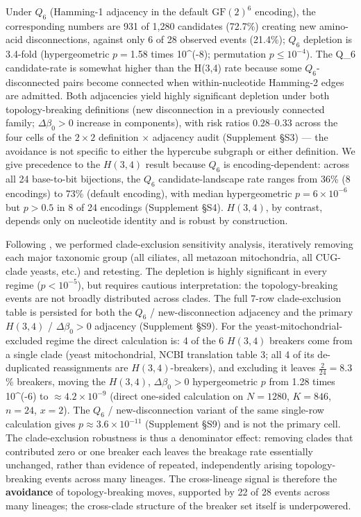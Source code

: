 \documentclass[preprint,11pt,authoryear,a4paper]{elsarticle}
\begin{document}
Under \(Q_{6}\) (Hamming-1 adjacency in the default
\({\text{GF}(2)}^{6}\) encoding), the corresponding numbers are 931 of
1,280 candidates (72.7\%) creating new amino-acid disconnections,
against only 6 of 28 observed events (21.4\%); \(Q_{6}\) depletion is
3.4-fold (hypergeometric \(p =\)1.58 times 10\^{}(-8)\(\); permutation
\(p \leq 10^{- 4}\)). The Q\_6 candidate-rate is somewhat higher than
the H(3,4) rate because some \(Q_{6}\)-disconnected pairs become
connected when within-nucleotide Hamming-2 edges are admitted. Both
adjacencies yield highly significant depletion under both
topology-breaking definitions (new disconnection in a previously
connected family; \(\Delta\beta_{0} > 0\) increase in components), with
risk ratios 0.28--0.33 across the four cells of the \(2 \times 2\)
definition \(\times\) adjacency audit (Supplement §S3) --- the avoidance
is not specific to either the hypercube subgraph or either definition.
We give precedence to the \(H(3,4)\) result because \(Q_{6}\) is
encoding-dependent: across all 24 base-to-bit bijections, the \(Q_{6}\)
candidate-landscape rate ranges from 36\% (8 encodings) to 73\% (default
encoding), with median hypergeometric \(p = 6 \times 10^{- 6}\) but
\(p > 0.5\) in 8 of 24 encodings (Supplement §S4). \(H(3,4)\), by
contrast, depends only on nucleotide identity and is robust by
construction.

Following \citep{sengupta2007}, we performed clade-exclusion sensitivity
analysis, iteratively removing each major taxonomic group (all ciliates,
all metazoan mitochondria, all CUG-clade yeasts, etc.) and retesting.
The depletion is highly significant in every regime (\(p < 10^{- 5}\)),
but requires cautious interpretation: the topology-breaking events are
not broadly distributed across clades. The full 7-row clade-exclusion
table is persisted for both the \(Q_{6}\) / new-disconnection adjacency
and the primary \(H(3,4)\) / \(\Delta\beta_{0} > 0\) adjacency
(Supplement §S9). For the yeast-mitochondrial-excluded regime the direct
calculation is: 4 of the 6 \(H(3,4)\) breakers come from a single clade
(yeast mitochondrial, NCBI translation table 3; all 4 of its
de-duplicated reassignments are \(H(3,4)\)-breakers), and excluding it
leaves \(\frac{2}{24} = 8.3\)\% breakers, moving the \(H(3,4)\),
\(\Delta\beta_{0} > 0\) hypergeometric \(p\) from \(\)1.28 times
10\^{}(-6)\(\) to \(\approx 4.2 \times 10^{- 9}\) (direct one-sided
calculation on \(N = 1280\), \(K = 846\), \(n = 24\), \(x = 2\)). The
\(Q_{6}\) / new-disconnection variant of the same single-row calculation
gives \(p \approx 3.6 \times 10^{- 11}\) (Supplement §S9) and is not the
primary cell. The clade-exclusion robustness is thus a denominator
effect: removing clades that contributed zero or one breaker each leaves
the breakage rate essentially unchanged, rather than evidence of
repeated, independently arising topology-breaking events across many
lineages. The cross-lineage signal is therefore the \textbf{avoidance}
of topology-breaking moves, supported by 22 of 28 events across many
lineages; the cross-clade structure of the breaker set itself is
underpowered.
\end{document}
